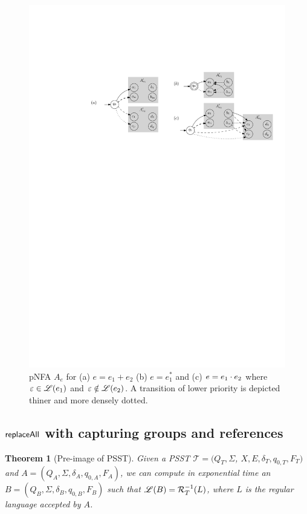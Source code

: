 \documentclass[sigplan,review,anonymous]{acmart}\settopmatter{printfolios=true,printccs=false,printacmref=false}
\newtheorem{theorem}{Theorem}
\newcommand\PSST{{\sf PSST}}
\newcommand\psst{\mathcal{T}}
\begin{document}
\begin{figure}
 \centering
 \includegraphics{pglushkov_01}
 \caption{pNFA $A_e$ for (a) $e=e_1+e_2$ (b) $e=e_1^{\ast}$ and (c) $e=e_1 \cdot e_2$ where $\varepsilon \in \mathscr{L}(e_1)$ and $\varepsilon \notin \mathscr{L}(e_2)$. A transition of lower priority is depicted thiner and more densely dotted. }
 \label{fig:pglushkov}
\end{figure}
 
\subsection{$\mathsf{replaceAll}$ with capturing groups and references}

\begin{theorem}[Pre-image of \PSST{}]
  Given a \PSST{} $\psst = (Q_T, \Sigma$, $X, E, \delta_T, q_{0, T}, F_T)$ and \FA{} $A
  = (Q_A, \Sigma, \delta_A, q_{0, A}, F_A)$, we can compute in exponential time an \FA{} $B = (Q_B,
  \Sigma, \delta_B, q_{0, B}, F_B)$ such that $\mathscr{L}(B) = \mathcal{R}^{-1}_T(L)$, where $L$ is the regular language accepted by $A$. 
\end{theorem}
 
\end{document}
